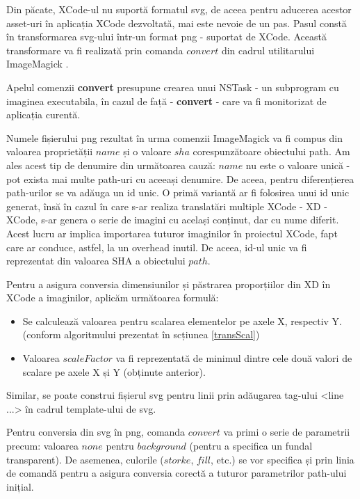 Din păcate, XCode-ul nu suportă formatul svg, de aceea pentru aducerea acestor asset-uri în aplicația XCode dezvoltată, mai este nevoie de un pas. Pasul constă în transformarea svg-ului într-un format png - suportat de XCode. Această transformare va fi realizată prin comanda $convert$ din cadrul utilitarului ImageMagick \cite{imageMagick}. 

Apelul comenzii \textbf{convert} presupune crearea unui NSTask - un subprogram cu imaginea executabila, în cazul de față - \textbf{convert} - care va fi monitorizat de aplicația curentă. 

Numele fișierului png rezultat în urma comenzii ImageMagick va fi compus din valoarea proprietății $name$ și o valoare $sha$ corespunzătoare obiectului path. Am ales acest tip de denumire din următoarea cauză: $name$ nu este o valoare unică - pot exista mai multe path-uri cu aceeași denumire. De aceea, pentru diferențierea path-urilor se va adăuga un id unic. O primă variantă ar fi folosirea unui id unic generat, însă în cazul în care s-ar realiza translatări multiple XCode - XD - XCode, s-ar genera o serie de imagini cu același conținut, dar cu nume diferit. Acest lucru ar implica importarea tuturor imaginilor în proiectul XCode, fapt care ar conduce, astfel, la un overhead inutil. De aceea, id-ul unic va fi reprezentat din valoarea SHA a obiectului $path$.

Pentru a asigura conversia dimensiunilor și păstrarea proporțiilor din XD în XCode a imaginilor, aplicăm următoarea formulă:

\begin{itemize}  
\item Se calculează valoarea pentru scalarea elementelor pe axele X, respectiv Y. (conform algoritmului prezentat în scțiunea \ref{transScal})
\item Valoarea $scaleFactor$ va fi reprezentată de minimul dintre cele două valori de scalare pe axele X și Y (obținute anterior).
\end{itemize}

Similar, se poate construi fișierul svg pentru linii prin adăugarea tag-ului <line ...> în cadrul template-ului de svg.

Pentru conversia din svg în png, comanda $convert$ va primi o serie de parametrii precum: valoarea $none$ pentru $background$ (pentru a specifica un fundal transparent). De asemenea, culorile ($storke$, $fill$, etc.) se vor specifica și prin linia de comandă pentru a asigura conversia corectă a tuturor parametrilor path-ului inițial.

